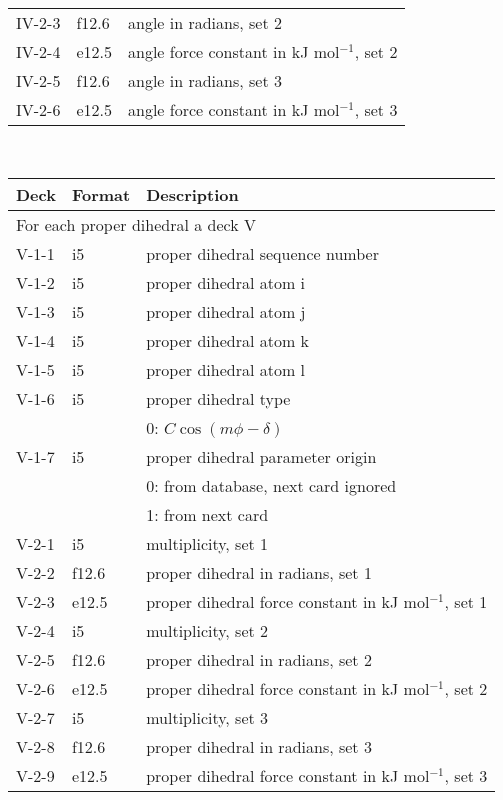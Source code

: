 \begin{center}
\begin{tabular*}{150mm}{p{12mm}p{12mm}l}
IV-2-3 & f12.6  & angle in radians, set 2\\
IV-2-4 & e12.5  & angle force constant in kJ mol$^{-1}$, set 2 \\
IV-2-5 & f12.6  & angle in radians, set 3\\
IV-2-6 & e12.5  & angle force constant in kJ mol$^{-1}$, set 3 \\
\hline
\end{tabular*}\\
\begin{tabular*}{150mm}{p{12mm}p{12mm}l}
\hline\hline
Deck & Format & Description \\ \hline
\multicolumn{3}{l}{For each proper dihedral a deck V} \\
V-1-1 & i5     & proper dihedral sequence number \\
V-1-2 & i5     & proper dihedral atom i \\
V-1-3 & i5     & proper dihedral atom j \\
V-1-4 & i5     & proper dihedral atom k \\
V-1-5 & i5     & proper dihedral atom l \\
V-1-6 & i5     & proper dihedral type \\
      &        & 0: $C\cos(m\phi-\delta)$\\
V-1-7 & i5     & proper dihedral parameter origin\\
      &        & 0: from database, next card ignored \\
      &        & 1: from next card\\
V-2-1 & i5     & multiplicity, set 1\\
V-2-2 & f12.6  & proper dihedral in radians, set 1\\
V-2-3 & e12.5  & proper dihedral force constant in kJ mol$^{-1}$, set 1 \\
V-2-4 & i5     & multiplicity, set 2\\
V-2-5 & f12.6  & proper dihedral in radians, set 2\\
V-2-6 & e12.5  & proper dihedral force constant in kJ mol$^{-1}$, set 2 \\
V-2-7 & i5     & multiplicity, set 3\\
V-2-8 & f12.6  & proper dihedral in radians, set 3\\
V-2-9 & e12.5  & proper dihedral force constant in kJ mol$^{-1}$, set 3 \\
\hline
\end{tabular*}\\
\begin{tabular*}{150mm}{p{12mm}p{12mm}l}

\end{tabular*}
\end{center}
